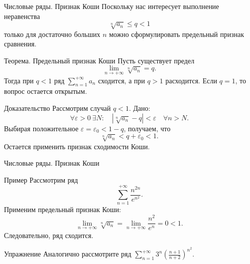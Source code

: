 \documentclass[8pt]{beamer}
\begin{document}

\begin{frame}{Числовые ряды. Признак Коши}
Поскольку нас интересует выполнение неравенства
$$\sqrt[n]{a_n}\le q<1$$
только для достаточно больших $n$ можно сформулировать предельный признак сравнения.
\begin{block}{Теорема. Предельный признак Коши}
Пусть существует предел
$$\lim_{n\to+\infty}\sqrt[n]{a_n} = q.$$
Тогда при $q<1$ ряд $\displaystyle \sum_{n=1}^{+\infty}a_n$ сходится, а при $q>1$ расходится. Если $q=1$, то вопрос остается открытым.
\end{block}
\begin{block}{Доказательство}
Рассмотрим случай $q<1$. Дано:
$$\forall \varepsilon>0 \ \exists N:\quad |\sqrt[n]{a_n}-q|<\varepsilon\quad \forall n>N.$$
Выбирая положительное $\varepsilon=\varepsilon_0 < 1-q$, получаем, что
$$\sqrt[n]{a_n}<q+\varepsilon_0<1.$$
Остается применить признак сходимости Коши.
\end{block}
\end{frame}

\begin{frame}{Числовые ряды. Признак Коши}
\begin{block}{Пример}
Рассмотрим ряд
$$\sum_{n=1}^{+\infty}\frac{n^{2n}}{e^{n^2}}.$$
Применим предельный признак Коши:
$$\lim_{n\to+\infty}\sqrt[n]{a_n} = \lim_{n\to+\infty}\frac{n^2}{e^{n}} = 0<1.$$
Следовательно, ряд сходится.
\end{block}
\begin{block}{Упражнение}
Аналогично рассмотрите ряд 
$\displaystyle \sum_{n=1}^{+\infty} 3^n \left(\frac{n+1}{n+2}\right)^{n^2}$.
\end{block}
\end{frame}
\end{document}
